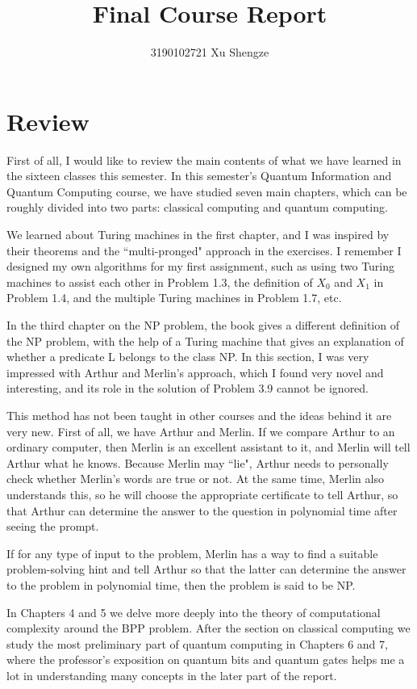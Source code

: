 \documentclass[11pt]{article}
\begin{document}
\title{{\bf Final Course Report}}
\author{3190102721 Xu Shengze}
\date{}
\maketitle

\section{Review}

\qquad First of all, I would like to review the main contents of what we have learned in the sixteen classes this semester. In this semester's Quantum Information and Quantum Computing course, we have studied seven main chapters, which can be roughly divided into two parts: classical computing and quantum computing.

We learned about Turing machines in the first chapter, and I was inspired by their theorems and the ``multi-pronged" approach in the exercises. I remember I designed my own algorithms for my first assignment, such as using two Turing machines to assist each other in Problem 1.3, the definition of $X_0$ and $X_1$ in Problem 1.4, and the multiple Turing machines in Problem 1.7, etc.

In the third chapter on the NP problem, the book gives a different definition of the NP problem, with the help of a Turing machine that gives an explanation of whether a predicate L belongs to the class NP. In this section, I was very impressed with Arthur and Merlin's approach, which I found very novel and interesting, and its role in the solution of Problem 3.9 cannot be ignored.

This method has not been taught in other courses and the ideas behind it are very new. First of all, we have Arthur and Merlin. If we compare Arthur to an ordinary computer, then Merlin is an excellent assistant to it, and Merlin will tell Arthur what he knows. Because Merlin may ``lie", Arthur needs to personally check whether Merlin's words are true or not. At the same time, Merlin also understands this, so he will choose the appropriate certificate to tell Arthur, so that Arthur can determine the answer to the question in polynomial time after seeing the prompt.

If for any type of input to the problem, Merlin has a way to find a suitable problem-solving hint and tell Arthur so that the latter can determine the answer to the problem in polynomial time, then the problem is said to be NP.

In Chapters 4 and 5 we delve more deeply into the theory of computational complexity around the BPP problem. After the section on classical computing we study the most preliminary part of quantum computing in Chapters 6 and 7, where the professor's exposition on quantum bits and quantum gates helps me a lot in understanding many concepts in the later part of the report.
\end{document}
